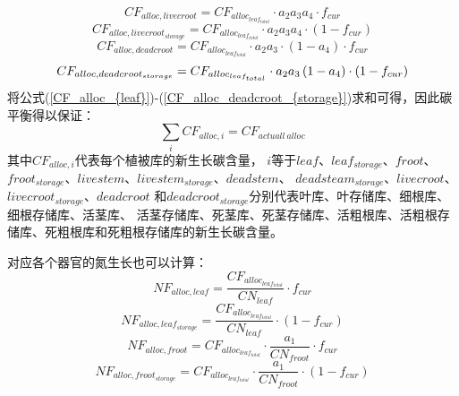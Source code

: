 \begin{equation}
  CF_{alloc,livecroot}=CF_{alloc_{leaf_{total}}}\cdot a_2a_3a_4\cdot f_{cur}
\end{equation}
\begin{equation}
  CF_{alloc,livecroot_{storage}}=CF_{alloc_{leaf_{total}}}\cdot a_2a_3a_4\cdot \left(1-f_{cur}\right)
\end{equation}
\begin{equation}
  CF_{alloc,deadcroot}=CF_{alloc_{leaf_{total}}}\cdot a_2a_3\cdot \left(1-a_4\right)\cdot f_{cur}
\end{equation}
\begin{equation}\label{CF_alloc_deadcroot_{storage}}
  CF_{alloc,deadcroot_{storage}}=CF_{alloc_{leaf_{total}}}\cdot a_2a_3\left(1-a_4\right)\cdot \left(1-f_{cur}\right)
\end{equation}
将公式(\ref{CF_alloc_{leaf}})-(\ref{CF_alloc_deadcroot_{storage}})求和可得，因此碳平衡得以保证：
\begin{equation}
  \sum_{i}{CF_{alloc,i}}=CF_{actuall\ {alloc}}
\end{equation}
其中$CF_{alloc,i}$代表每个植被库的新生长碳含量，
$i$等于$leaf$、$leaf_{storage}$、$froot$、$froot_{storage}$、$livestem$、$livestem_{storage}$、$deadstem$、
 $deadsteam_{storage}$、$livecroot$、 $livecroot_{storage}$、$deadcroot$
 和$deadcroot_{storage}$分别代表叶库、叶存储库、细根库、细根存储库、活茎库、
 活茎存储库、死茎库、死茎存储库、活粗根库、活粗根存储库、死粗根库和死粗根存储库的新生长碳含量。



 对应各个器官的氮生长也可以计算：
\begin{equation}
  NF_{alloc,leaf}=\frac{CF_{alloc_{leaf_{total}}}}{CN_{leaf}}\cdot f_{cur}
\end{equation}
\begin{equation}
  NF_{alloc,leaf_{storage}}=\frac{CF_{alloc_{leaf_{total}}}}{CN_{leaf}}\cdot \left(1-f_{cur}\right)
\end{equation}
\begin{equation}
  NF_{alloc,froot}=CF_{alloc_{leaf_{total}}}\cdot \frac{a_1}{CN_{froot}}\cdot f_{cur}
\end{equation}
\begin{equation}
  NF_{alloc,froot_{storage}}=CF_{alloc_{leaf_{total}}}\cdot \frac{a_1}{CN_{froot}}\cdot \left(1-f_{cur}\right)
\end{equation}

